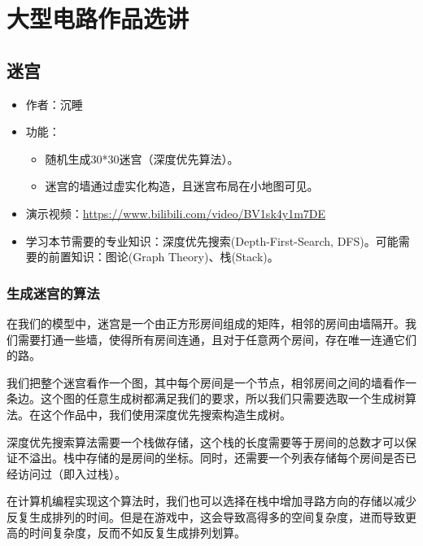 \chapter{大型电路作品选讲}

\section{迷宫}

\begin{itemize}
  \item 作者：沉睡
  \item 功能：
        \begin{itemize}
          \item 随机生成30*30迷宫（深度优先算法）。
          \item 迷宫的墙通过虚实化构造，且迷宫布局在小地图可见。
        \end{itemize}
  \item 演示视频：\url{https://www.bilibili.com/video/BV1sk4y1m7DE}
  \item 学习本节需要的专业知识：深度优先搜索(Depth-First-Search, DFS)。可能需要的前置知识：图论(Graph Theory)、栈(Stack)。
\end{itemize}

\subsection{生成迷宫的算法}
在我们的模型中，迷宫是一个由正方形房间组成的矩阵，相邻的房间由墙隔开。我们需要打通一些墙，使得所有房间连通，且对于任意两个房间，存在唯一连通它们的路。

我们把整个迷宫看作一个图，其中每个房间是一个节点，相邻房间之间的墙看作一条边。这个图的任意生成树都满足我们的要求，所以我们只需要选取一个生成树算法。在这个作品中，我们使用深度优先搜索构造生成树。

深度优先搜索算法需要一个栈做存储，这个栈的长度需要等于房间的总数才可以保证不溢出。栈中存储的是房间的坐标。同时，还需要一个列表存储每个房间是否已经访问过（即入过栈）。

\begin{remark*}
  在计算机编程实现这个算法时，我们也可以选择在栈中增加寻路方向的存储以减少反复生成排列的时间。但是在游戏中，这会导致高得多的空间复杂度，进而导致更高的时间复杂度，反而不如反复生成排列划算。
\end{remark*}


